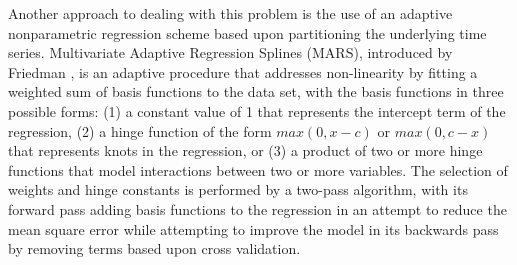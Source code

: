 \documentclass[times,10pt,finalversion]{usetex-v1}
\begin{document}
Another approach to dealing with this problem is the use of an adaptive
nonparametric regression scheme based upon partitioning the underlying
time series.  Multivariate Adaptive Regression Splines (MARS),
introduced by Friedman \cite{Friedman1991}, is an adaptive procedure
that addresses non-linearity by fitting a weighted sum of basis
functions to the data set, with the basis functions in three possible forms:
(1) a constant value of 1 that represents the intercept term of the
regression, (2) a hinge function of the form $max(0,x-c)$ or
$max(0,c-x)$ that represents knots in the regression, or (3) a product
of two or more hinge functions that model interactions between two or
more variables.  The selection of weights and hinge constants is
performed by a two-pass algorithm, with its forward pass adding basis
functions to the regression in an attempt to reduce the mean square
error while attempting to improve the model in its backwards pass by
removing terms based upon cross validation.
\end{document}
